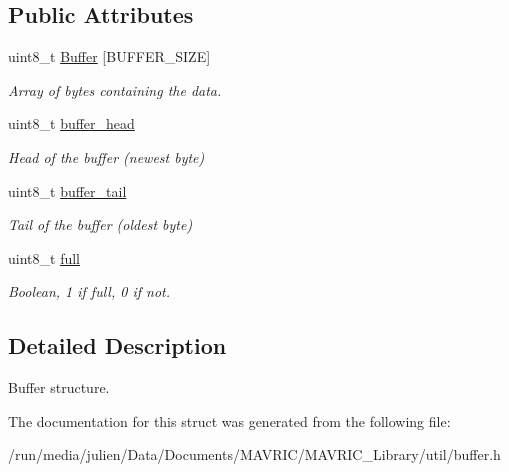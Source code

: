 \subsection*{Public Attributes}
\begin{DoxyCompactItemize}
\item 
\hypertarget{structbuffer__t_ab68ca27b11cfe505ee0d59f48494f01f}{uint8\+\_\+t \hyperlink{structbuffer__t_ab68ca27b11cfe505ee0d59f48494f01f}{Buffer} \mbox{[}B\+U\+F\+F\+E\+R\+\_\+\+S\+I\+Z\+E\mbox{]}}\label{structbuffer__t_ab68ca27b11cfe505ee0d59f48494f01f}

\begin{DoxyCompactList}\small\item\em Array of bytes containing the data. \end{DoxyCompactList}\item 
\hypertarget{structbuffer__t_a951a99b8b146be60a86dd9707bf61b2a}{uint8\+\_\+t \hyperlink{structbuffer__t_a951a99b8b146be60a86dd9707bf61b2a}{buffer\+\_\+head}}\label{structbuffer__t_a951a99b8b146be60a86dd9707bf61b2a}

\begin{DoxyCompactList}\small\item\em Head of the buffer (newest byte) \end{DoxyCompactList}\item 
\hypertarget{structbuffer__t_a700582657536b6311d124f948d5c901e}{uint8\+\_\+t \hyperlink{structbuffer__t_a700582657536b6311d124f948d5c901e}{buffer\+\_\+tail}}\label{structbuffer__t_a700582657536b6311d124f948d5c901e}

\begin{DoxyCompactList}\small\item\em Tail of the buffer (oldest byte) \end{DoxyCompactList}\item 
\hypertarget{structbuffer__t_aaf381f4f39d68fbb17134d595f666835}{uint8\+\_\+t \hyperlink{structbuffer__t_aaf381f4f39d68fbb17134d595f666835}{full}}\label{structbuffer__t_aaf381f4f39d68fbb17134d595f666835}

\begin{DoxyCompactList}\small\item\em Boolean, 1 if full, 0 if not. \end{DoxyCompactList}\end{DoxyCompactItemize}


\subsection{Detailed Description}
Buffer structure. 

The documentation for this struct was generated from the following file\+:\begin{DoxyCompactItemize}
\item 
/run/media/julien/\+Data/\+Documents/\+M\+A\+V\+R\+I\+C/\+M\+A\+V\+R\+I\+C\+\_\+\+Library/util/buffer.\+h\end{DoxyCompactItemize}
